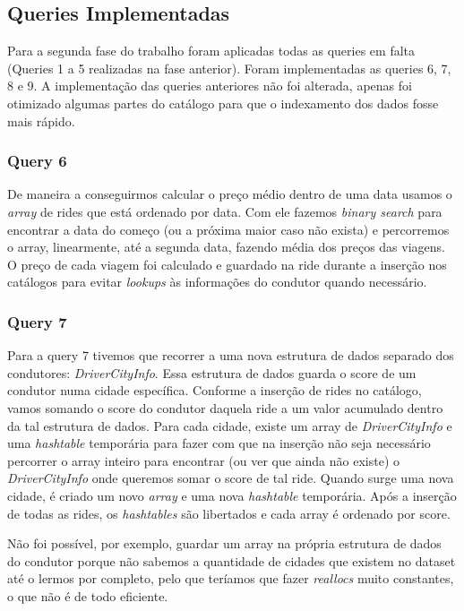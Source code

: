 \documentclass{article}
\begin{document}
    \subsection{Queries Implementadas}
        Para a segunda fase do trabalho foram aplicadas todas as queries em falta
        (Queries 1 a 5 realizadas na fase anterior). Foram implementadas as queries 6, 7, 8 e 9.
        A implementação das queries anteriores não foi alterada, apenas foi otimizado
        algumas partes do catálogo para que o indexamento dos dados fosse mais rápido.
        \subsubsection{Query 6}
            De maneira a conseguirmos calcular o preço médio dentro de uma data usamos
            o \emph{array} de rides que está ordenado por data. Com ele fazemos \emph{binary search} para
            encontrar a data do começo (ou a próxima maior caso não exista) e percorremos o array, 
            linearmente, até a segunda data, fazendo média dos preços das viagens. O preço
            de cada viagem foi calculado e guardado na ride durante a inserção nos catálogos para evitar
            \emph{lookups} às informações do condutor quando necessário.
        \subsubsection{Query 7}
            Para a query 7 tivemos que recorrer a uma nova estrutura de dados separado dos condutores: \emph{DriverCityInfo}. 
            Essa estrutura de dados guarda o score de um condutor numa cidade específica.
            Conforme a inserção de rides no catálogo, vamos somando o score do condutor daquela ride
            a um valor acumulado dentro da tal estrutura de dados. Para cada cidade, existe um array de \emph{DriverCityInfo} e
            uma \emph{hashtable} temporária para fazer com que na inserção não
            seja necessário percorrer o array inteiro para encontrar (ou ver que ainda não existe)
            o \emph{DriverCityInfo} onde queremos somar o score de tal ride. 
            Quando surge uma nova cidade, é criado um novo \emph{array} e uma nova \emph{hashtable} temporária.
            Após a inserção de todas as rides, os \emph{hashtables} são libertados e cada array é ordenado por score.
            
            Não foi possível, por exemplo, guardar um array na própria estrutura de dados do condutor
            porque não sabemos a quantidade de cidades que existem no dataset até o lermos por completo,
            pelo que teríamos que fazer \emph{reallocs} muito constantes, o que não é de todo eficiente.
\end{document}
